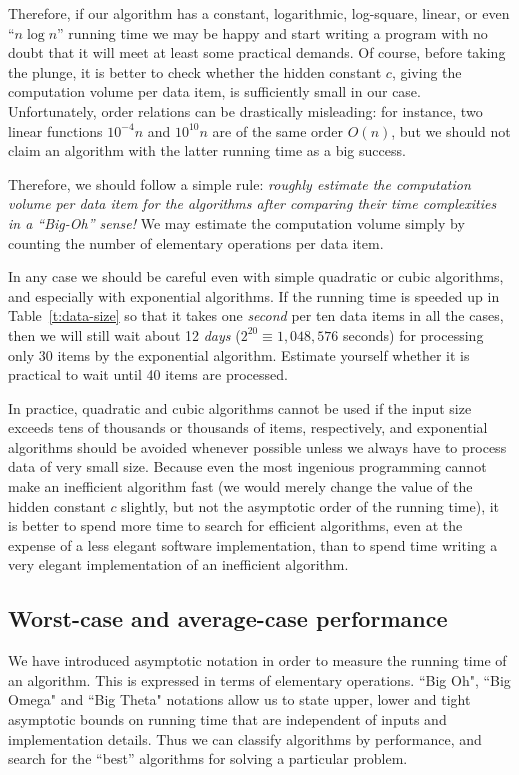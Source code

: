 Therefore, if our algorithm has a constant, logarithmic, log-square, linear, 
or even ``$n \log n$'' running time we may be happy and start writing a 
program with no doubt that it will meet at least some practical demands. 
Of course, before taking the plunge, it is better to check whether the hidden 
constant $c$, giving the computation volume per data item, is sufficiently small
in our case. Unfortunately, order relations can be drastically
misleading: for instance, two linear functions $10^{-4}n$ and $10^{10}n$
are of the same order $O(n)$, but we should not claim an
algorithm with the latter running time as a big success.

Therefore, we should follow a simple rule: \emph{roughly estimate 
the computation volume per data item for the algorithms after comparing
their time complexities in a ``Big-Oh'' sense!} We may estimate the
computation volume simply by counting the number of elementary
operations per data item.

In any case we should be  careful even with simple
quadratic or cubic algorithms, and especially with exponential
algorithms. If the running time is speeded up in Table~\ref{t:data-size} so that
it takes one \emph{second} per ten data items
in all the cases, then we will still wait about 12 \emph{days}
(\(2^{20}\equiv 1,048,576\) seconds) for processing only 30 items by the 
exponential algorithm. Estimate yourself whether it is
practical to wait until 40 items are processed.
 
In practice, quadratic and cubic algorithms cannot be used if the input
size exceeds tens of thousands or thousands of items, respectively,
and exponential algorithms should be avoided whenever possible unless we
always have to process data of very small size. Because even the most
ingenious programming cannot make an inefficient algorithm fast (we
would merely change the value of the hidden constant $c$ slightly, but
not the asymptotic order of the running time), it is better to spend
more time to search for efficient algorithms, even at the expense of a
less elegant software implementation, than to spend time writing a very
elegant implementation of an inefficient algorithm. 

\subsection{Worst-case and average-case performance}
\label{ss:worst-vs-avg}

We have introduced asymptotic notation in order to measure the running time of 
an algorithm. This is expressed in terms of elementary operations. ``Big Oh", 
``Big Omega" and ``Big Theta" notations allow us to state upper, lower
 and tight asymptotic bounds on running time that are independent of inputs and
implementation details. Thus we can classify algorithms by 
performance, and search for the ``best'' algorithms for solving a particular problem.  

